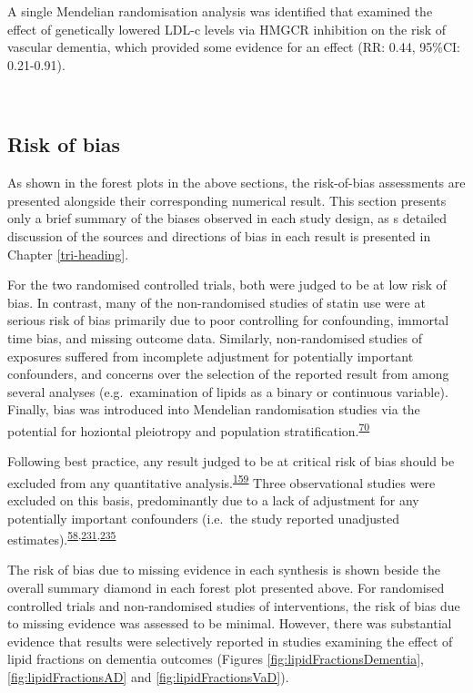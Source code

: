 \documentclass[a4paper, twoside]{templates/ociamthesis}
\begin{document}
A single Mendelian randomisation analysis was identified that examined the effect of genetically lowered LDL-c levels via HMGCR inhibition on the risk of vascular dementia, which provided some evidence for an effect (RR: 0.44, 95\%CI: 0.21-0.91).

~

\hypertarget{risk-of-bias-res}{%
\subsection{Risk of bias}\label{risk-of-bias-res}}

As shown in the forest plots in the above sections, the risk-of-bias assessments are presented alongside their corresponding numerical result. This section presents only a brief summary of the biases observed in each study design, as s detailed discussion of the sources and directions of bias in each result is presented in Chapter \ref{tri-heading}.

For the two randomised controlled trials, both were judged to be at low risk of bias. In contrast, many of the non-randomised studies of statin use were at serious risk of bias primarily due to poor controlling for confounding, immortal time bias, and missing outcome data. Similarly, non-randomised studies of exposures suffered from incomplete adjustment for potentially important confounders, and concerns over the selection of the reported result from among several analyses (e.g.~examination of lipids as a binary or continuous variable). Finally, bias was introduced into Mendelian randomisation studies via the potential for hoziontal pleiotropy and population stratification.\textsuperscript{\protect\hyperlink{ref-davies2018}{70}}

Following best practice, any result judged to be at critical risk of bias should be excluded from any quantitative analysis.\textsuperscript{\protect\hyperlink{ref-sterne2016}{159}} Three observational studies were excluded on this basis, predominantly due to a lack of adjustment for any potentially important confounders (i.e.~the study reported unadjusted estimates).\textsuperscript{\protect\hyperlink{ref-mainous2005}{58},\protect\hyperlink{ref-kuo2015}{231},\protect\hyperlink{ref-notkola1998}{235}}

The risk of bias due to missing evidence in each synthesis is shown beside the overall summary diamond in each forest plot presented above. For randomised controlled trials and non-randomised studies of interventions, the risk of bias due to missing evidence was assessed to be minimal. However, there was substantial evidence that results were selectively reported in studies examining the effect of lipid fractions on dementia outcomes (Figures \ref{fig:lipidFractionsDementia}, \ref{fig:lipidFractionsAD} and \ref{fig:lipidFractionsVaD}).
\end{document}
